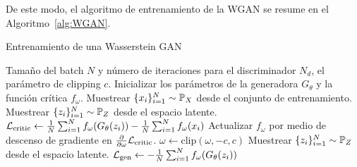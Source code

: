 {{De este modo, el algoritmo de entrenamiento de la WGAN se resume en el Algoritmo~\ref{alg:WGAN}.

\begin{algorithm}[ht!]
    \caption{Entrenamiento de una Wasserstein GAN}\label{alg:WGAN}
    \begin{algorithmic}[1]
        \Require Tamaño del batch $N$ y número de iteraciones para el discriminador $N_d$, el parámetro de clipping $c$.
        \State Inicializar los parámetros de la generadora $G_\theta$ y la función crítica $f_\omega$.
        \State Muestrear $\{x_i\}_{i=1}^{N} \sim \Prob_X$ desde el conjunto de entrenamiento.
        \State Muestrear $\{z_i\}_{i=1}^{N} \sim \Prob_Z$ desde el espacio latente.
        \State $\mathcal{L}_{\mathrm{critic}} \gets
            \frac{1}{N} \sum_{i=1}^{N} f_{\omega}(G_\theta(z_i)) - \frac{1}{N} \sum_{i=1}^{N} f_{\omega}(x_i)$ 
        \State Actualizar $f_{\omega}$ por medio de descenso de gradiente en $\pdv{\omega} \mathcal{L}_{\mathrm{critic}}$.
        \State $\omega \gets \text{clip}(\omega, -c, c)$
        \EndFor
        \State Muestrear $\{z_i\}_{i=1}^{N} \sim \Prob_Z$ desde el espacio latente.
        \State $\mathcal{L}_{\mathrm{gen}} \gets - \frac{1}{N}\sum_{i=1}^{N} f_\omega(G_\theta(z_i))$ 

\end{algorithmic}
\end{algorithm}}}
